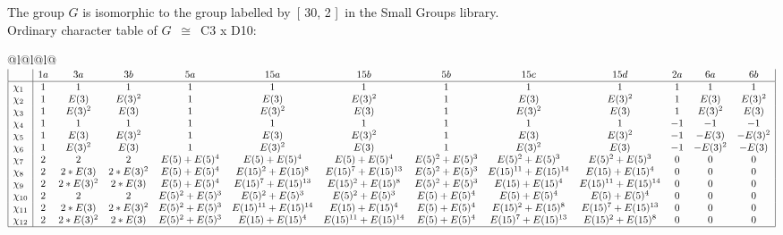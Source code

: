 \documentclass[varwidth=\maxdimen,border=10]{standalone}
\begin{document}
The group $G$ is isomorphic to the group labelled by\ [ 30, 2 ]\ in the Small Groups library.\\
Ordinary character table of $G$\ $\cong$\ C3 x D10:\\
\begin{center}
\begin{tabular}{@{}l@{}l@{}l@{}}
\hline
\(\begin{array}{|l|cccccccccccc|}
  & 1a & 3a & 3b & 5a & 15a & 15b & 5b & 15c & 15d & 2a & 6a & 6b\\ \hline
\chi_{1} & 1 & 1 & 1 & 1 & 1 & 1 & 1 & 1 & 1 & 1 & 1 & 1\\
\chi_{2} & 1 & E(3) & E(3)^{2} & 1 & E(3) & E(3)^{2} & 1 & E(3) & E(3)^{2} & 1 & E(3) & E(3)^{2}\\
\chi_{3} & 1 & E(3)^{2} & E(3) & 1 & E(3)^{2} & E(3) & 1 & E(3)^{2} & E(3) & 1 & E(3)^{2} & E(3)\\
\chi_{4} & 1 & 1 & 1 & 1 & 1 & 1 & 1 & 1 & 1 & -1 & -1 & -1\\
\chi_{5} & 1 & E(3) & E(3)^{2} & 1 & E(3) & E(3)^{2} & 1 & E(3) & E(3)^{2} & -1 & -E(3) & -E(3)^{2}\\
\chi_{6} & 1 & E(3)^{2} & E(3) & 1 & E(3)^{2} & E(3) & 1 & E(3)^{2} & E(3) & -1 & -E(3)^{2} & -E(3)\\
\chi_{7} & 2 & 2 & 2 & E(5)+E(5)^{4} & E(5)+E(5)^{4} & E(5)+E(5)^{4} & E(5)^{2}+E(5)^{3} & E(5)^{2}+E(5)^{3} & E(5)^{2}+E(5)^{3} & 0 & 0 & 0\\
\chi_{8} & 2 & 2*E(3) & 2*E(3)^{2} & E(5)+E(5)^{4} & E(15)^{2}+E(15)^{8} & E(15)^{7}+E(15)^{13} & E(5)^{2}+E(5)^{3} & E(15)^{11}+E(15)^{14} & E(15)+E(15)^{4} & 0 & 0 & 0\\
\chi_{9} & 2 & 2*E(3)^{2} & 2*E(3) & E(5)+E(5)^{4} & E(15)^{7}+E(15)^{13} & E(15)^{2}+E(15)^{8} & E(5)^{2}+E(5)^{3} & E(15)+E(15)^{4} & E(15)^{11}+E(15)^{14} & 0 & 0 & 0\\
\chi_{10} & 2 & 2 & 2 & E(5)^{2}+E(5)^{3} & E(5)^{2}+E(5)^{3} & E(5)^{2}+E(5)^{3} & E(5)+E(5)^{4} & E(5)+E(5)^{4} & E(5)+E(5)^{4} & 0 & 0 & 0\\
\chi_{11} & 2 & 2*E(3) & 2*E(3)^{2} & E(5)^{2}+E(5)^{3} & E(15)^{11}+E(15)^{14} & E(15)+E(15)^{4} & E(5)+E(5)^{4} & E(15)^{2}+E(15)^{8} & E(15)^{7}+E(15)^{13} & 0 & 0 & 0\\
\chi_{12} & 2 & 2*E(3)^{2} & 2*E(3) & E(5)^{2}+E(5)^{3} & E(15)+E(15)^{4} & E(15)^{11}+E(15)^{14} & E(5)+E(5)^{4} & E(15)^{7}+E(15)^{13} & E(15)^{2}+E(15)^{8} & 0 & 0 & 0\\
\hline
\end{array}\)\\
\end{tabular}
\end{center}
\end{document}
